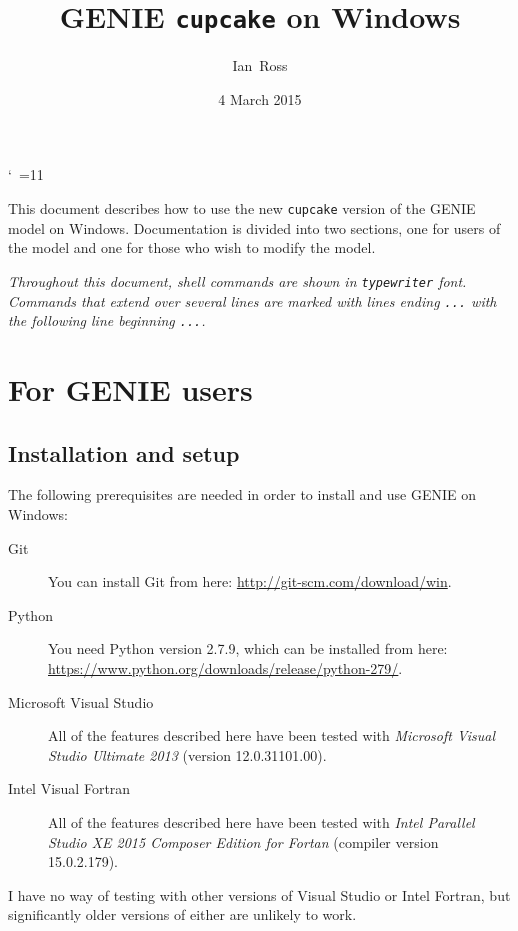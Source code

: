 \documentclass[a4paper,10pt,article]{memoir}
\title{GENIE \texttt{cupcake} on Windows}
\author{Ian~Ross}
\date{4 March 2015}
\begin{document}
\catcode`~=11    %

\maketitle

This document describes how to use the new \texttt{cupcake} version of
the GENIE model on Windows.  Documentation is divided into two
sections, one for users of the model and one for those who wish to
modify the model.

\emph{Throughout this document, shell commands are shown in
  \texttt{typewriter} font.  Commands that extend over several lines
  are marked with lines ending \texttt{...} with the following line
  beginning \texttt{...}.}

\chapter{For GENIE users}

\section{Installation and setup}

The following prerequisites are needed in order to install and use
GENIE on Windows:
\begin{description}
  \item[Git]{You can install Git from here:
    \url{http://git-scm.com/download/win}.}
  \item[Python]{You need Python version 2.7.9, which can be installed
    from here:
    \url{https://www.python.org/downloads/release/python-279/}.}
  \item[Microsoft Visual Studio]{All of the features described here
    have been tested with \emph{Microsoft Visual Studio Ultimate 2013}
    (version 12.0.31101.00).}
  \item[Intel Visual Fortran]{All of the features described here have
    been tested with \emph{Intel Parallel Studio XE 2015 Composer
      Edition for Fortan} (compiler version 15.0.2.179).}
\end{description}

I have no way of testing with other versions of Visual Studio or Intel
Fortran, but significantly older versions of either are unlikely to
work.
\end{document}
